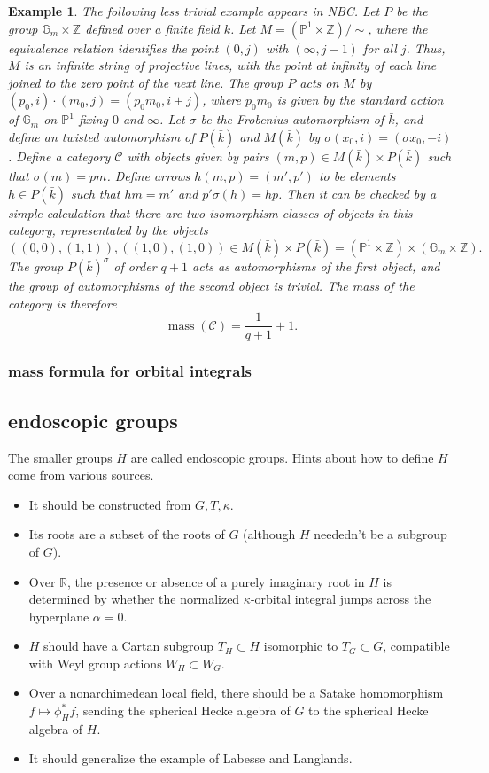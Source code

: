 \documentclass[brochure,english,12pt]{bourbaki}
\newtheorem{example}[equation]{Example}
\def\op#1{{\operatorname{#1}}}
\newcommand{\ring}[1]{\mathbb{#1}}
\def\mass{\op{mass}}
\def\C{{\mathcal C}}
\begin{document}
\begin{example}
The following less trivial example appears in NBC.  Let $P$ be the
group $\ring{G}_m\times \ring{Z}$ defined over a finite field $k$.
Let $M = (\ring{P}^1\times\ring{Z})/\sim$, where the equivalence
relation identifies the point $(0,j)$ with $(\infty,j-1)$ for all $j$.
Thus, $M$ is an infinite string of projective lines, with the point at infinity of each line joined to the
zero point of the next line.  The group $P$ acts on $M$ by $(p_0,i)\cdot
(m_0,j) = (p_0 m_0,i+j)$, where $p_0m_0$ is given by the standard action of
$\ring{G}_m$ on $\ring{P}^1$ fixing $0$ and $\infty$.  
Let $\sigma$ be the Frobenius automorphism
of $\bar k$, and define an twisted automorphism of $P(\bar k)$ and $M(\bar k)$
by $\sigma(x_0,i) = (\sigma x_0,-i)$.  Define a category $\mathcal C$ with
objects given by pairs $(m,p)\in M(\bar k)\times P(\bar k)$ such that $\sigma(m) = p
m$.  Define  arrows $h(m,p) = (m',p')$ to be elements $h\in P(\bar k)$ such
that $hm = m'$ and $p'\sigma(h) = h p$.  Then it can be checked by a simple
calculation that there are two isomorphism classes of objects in this
category, representated by the objects
\[
((0,0),(1,1)), ((1,0),(1,0))\in M(\bar k)\times P(\bar k) = 
(\ring{P}^1\times\ring{Z}) \times (\ring{G}_m\times\ring{Z}).
\]
The group $P(\bar k)^\sigma$ of order $q+1$ acts as automorphisms of the first object,
and the group of automorphisms of the second object is trivial.  The mass of the category
is therefore
\[
\mass(\C) = \frac{1}{q+1} + 1.
\]
\end{example}

\subsubsection{mass formula for orbital integrals}


\subsection{endoscopic groups}

The
smaller groups $H$ are called endoscopic groups.
Hints about how to define $H$ come from various sources.
\begin{itemize}
\item It should be constructed from $G,T,\kappa$.
\item Its roots are a subset of the roots of $G$ (although $H$ neededn't
be a subgroup of $G$).
\item Over $\ring{R}$, the presence or absence of a purely imaginary
root in $H$ is determined by whether the normalized $\kappa$-orbital
integral jumps across the hyperplane $\alpha=0$.
\item $H$ should have a Cartan subgroup $T_H\subset H$ isomorphic to
$T_G\subset G$, compatible with Weyl group actions $W_H\subset W_G$.
\item Over a nonarchimedean local field, there should be a Satake
homomorphism $f \mapsto \phi^*_Hf$, sending the spherical Hecke algebra
of $G$ to the spherical Hecke algebra of $H$.
\item It should generalize the example of Labesse and Langlands.
\end{itemize}
\end{document}
